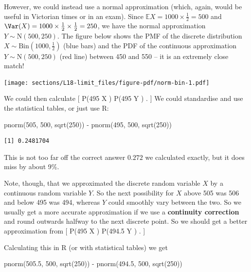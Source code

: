 \documentclass[
  letterpaper,
]{report}
\newenvironment{Shaded}{\begin{snugshade}}{\end{snugshade}}
\newcommand{\DecValTok}[1]{\textcolor[rgb]{0.68,0.00,0.00}{#1}}
\newcommand{\FloatTok}[1]{\textcolor[rgb]{0.68,0.00,0.00}{#1}}
\newcommand{\FunctionTok}[1]{\textcolor[rgb]{0.28,0.35,0.67}{#1}}
\newcommand{\NormalTok}[1]{\textcolor[rgb]{0.00,0.23,0.31}{#1}}
\newcommand{\SpecialCharTok}[1]{\textcolor[rgb]{0.37,0.37,0.37}{#1}}
\theoremstyle{definition}
\theoremstyle{definition}
\theoremstyle{remark}
\begin{document}
However, we could instead use a normal approximation (which, again,
would be useful in Victorian times or in an exam). Since
\(\mathbb EX = 1000 \times \frac12 = 500\) and
\(\Var(X) = 1000 \times \frac12 \times \frac12 = 250\), we have the
normal approximation \(Y \sim \mathrm N(500, 250)\). The figure below
shows the PMF of the discrete distribution
\(X \sim \mathrm{Bin}(1000, \frac12)\) (blue bars) and the PDF of the
continuous approximation \(Y\sim \mathrm N(500, 250)\) (red line)
between 450 and 550 -- it is an extremely close match!

\texttt{[image: sections/L18-limit\_files/figure-pdf/norm-bin-1.pdf]}

We could then calculate {[} \mathbb P(495 \leq X )
\approx \mathbb P(495 \leq Y ) . {]} We could standardise and
use the statistical tables, or just use R:

\begin{Shaded}
\begin{Highlighting}[]
\FunctionTok{pnorm}\NormalTok{(}\DecValTok{505}\NormalTok{, }\DecValTok{500}\NormalTok{, }\FunctionTok{sqrt}\NormalTok{(}\DecValTok{250}\NormalTok{)) }\SpecialCharTok{{-}} \FunctionTok{pnorm}\NormalTok{(}\DecValTok{495}\NormalTok{, }\DecValTok{500}\NormalTok{, }\FunctionTok{sqrt}\NormalTok{(}\DecValTok{250}\NormalTok{))}
\end{Highlighting}
\end{Shaded}

\begin{verbatim}
[1] 0.2481704
\end{verbatim}

This is not too far off the correct answer \(0.272\) we calculated
exactly, but it does miss by about 9\%.

Note, though, that we approximated the discrete random variable \(X\) by
a continuous random variable \(Y\). So the next possibility for \(X\)
above 505 was 506 and below 495 was 494, whereas \(Y\) could smoothly
vary between the two. So we usually get a more accurate approximation if
we use a \textbf{continuity correction} and round outwards halfway to
the next discrete point. So we should get a better approximation from
{[} \mathbb P(495 \leq X ) \approx \mathbb P(494.5 \leq Y
) . {]}

Calculating this in R (or with statistical tables) we get

\begin{Shaded}
\begin{Highlighting}[]
\FunctionTok{pnorm}\NormalTok{(}\FloatTok{505.5}\NormalTok{, }\DecValTok{500}\NormalTok{, }\FunctionTok{sqrt}\NormalTok{(}\DecValTok{250}\NormalTok{)) }\SpecialCharTok{{-}} \FunctionTok{pnorm}\NormalTok{(}\FloatTok{494.5}\NormalTok{, }\DecValTok{500}\NormalTok{, }\FunctionTok{sqrt}\NormalTok{(}\DecValTok{250}\NormalTok{))}
\end{Highlighting}
\end{Shaded}
\end{document}
